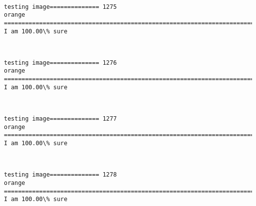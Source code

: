 \documentclass[11pt]{article}
\begin{document}
    \begin{center}
    \end{center}
    { \hspace*{\fill} \\}
    
    \begin{Verbatim}[commandchars=\\\{\}]
testing image============== 1275
orange
============================================================================
I am 100.00\% sure

    \end{Verbatim}

    \begin{center}
    \end{center}
    { \hspace*{\fill} \\}
    
    \begin{Verbatim}[commandchars=\\\{\}]
testing image============== 1276
orange
============================================================================
I am 100.00\% sure

    \end{Verbatim}

    \begin{center}
    \end{center}
    { \hspace*{\fill} \\}
    
    \begin{Verbatim}[commandchars=\\\{\}]
testing image============== 1277
orange
============================================================================
I am 100.00\% sure

    \end{Verbatim}

    \begin{center}
    \end{center}
    { \hspace*{\fill} \\}
    
    \begin{Verbatim}[commandchars=\\\{\}]
testing image============== 1278
orange
============================================================================
I am 100.00\% sure

    \end{Verbatim}
\end{document}
